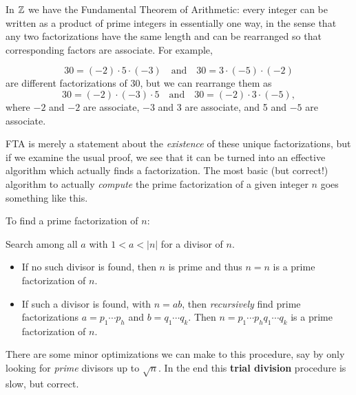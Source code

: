 In \(\mathbb{Z}\) we have the Fundamental Theorem of Arithmetic: every integer can be written as a product of prime integers in essentially one way, in the sense that any two factorizations have the same length and can be rearranged so that corresponding factors are associate. For example,

\[ 30 = (-2) \cdot 5 \cdot (-3) \quad \mathrm{and} \quad 30 = 3 \cdot (-5) \cdot (-2) \] are different factorizations of 30, but we can rearrange them as \[ 30 = (-2) \cdot (-3) \cdot 5 \quad \mathrm{and} \quad 30 = (-2) \cdot 3 \cdot (-5), \] where \(-2\) and \(-2\) are associate, \(-3\) and 3 are associate, and 5 and \(-5\) are associate.

FTA is merely a statement about the \emph{existence} of these unique factorizations, but if we examine the usual proof, we see that it can be turned into an effective algorithm which actually finds a factorization. The most basic (but correct!) algorithm to actually \emph{compute} the prime factorization of a given integer \(n\) goes something like this.

\begin{framed}
\noindent To find a prime factorization of \(n\):

Search among all \(a\) with \(1 < a < |n|\) for a divisor of \(n\).
\begin{itemize}
\item If no such divisor is found, then \(n\) is prime and thus \(n = n\) is a prime factorization of \(n\).
\item If such a divisor is found, with \(n = ab\), then \emph{recursively} find prime factorizations \(a = p_1 \cdots p_h\) and \(b = q_1 \cdots q_k\). Then \(n = p_1 \cdots p_h q_1 \cdots q_k\) is a prime factorization of \(n\).
\end{itemize}
\end{framed}

There are some minor optimizations we can make to this procedure, say by only looking for \emph{prime} divisors up to \(\sqrt{n}\). In the end this \textbf{trial division} procedure is slow, but correct.

